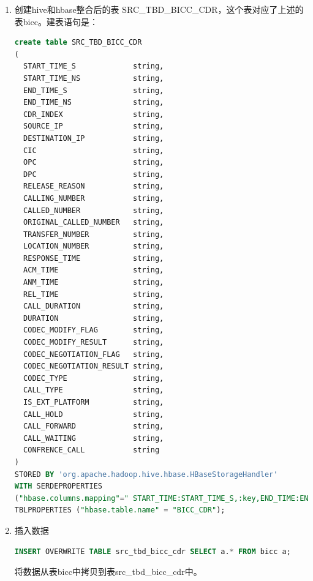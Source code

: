 \begin{enumerate}

\item 创建hive和hbase整合后的表 SRC\_TBD\_BICC\_CDR，这个表对应了上述的表bicc。建表语句是：

\begin{lstlisting}[language=SQL]
create table SRC_TBD_BICC_CDR
(
  START_TIME_S             string,
  START_TIME_NS            string,
  END_TIME_S               string,
  END_TIME_NS              string,
  CDR_INDEX                string,
  SOURCE_IP                string,
  DESTINATION_IP           string,
  CIC                      string,
  OPC                      string,
  DPC                      string,
  RELEASE_REASON           string,
  CALLING_NUMBER           string,
  CALLED_NUMBER            string,
  ORIGINAL_CALLED_NUMBER   string,
  TRANSFER_NUMBER          string,
  LOCATION_NUMBER          string,
  RESPONSE_TIME            string,
  ACM_TIME                 string,
  ANM_TIME                 string,
  REL_TIME                 string,
  CALL_DURATION            string,
  DURATION                 string,
  CODEC_MODIFY_FLAG        string,
  CODEC_MODIFY_RESULT      string,
  CODEC_NEGOTIATION_FLAG   string,
  CODEC_NEGOTIATION_RESULT string,
  CODEC_TYPE               string,
  CALL_TYPE                string,
  IS_EXT_PLATFORM          string,
  CALL_HOLD                string,
  CALL_FORWARD             string,
  CALL_WAITING             string,
  CONFRENCE_CALL           string
)
STORED BY 'org.apache.hadoop.hive.hbase.HBaseStorageHandler'  
WITH SERDEPROPERTIES 
("hbase.columns.mapping"=" START_TIME:START_TIME_S,:key,END_TIME:END_TIME_S,END_TIME:END_TIME_NS,INDEX:CDR_INDEX,IP:SOURCE_IP,IP:DESTINATION_IP,C:CIC,C:OPC,C:DPC,REASON:RELEASE_REASON,NUMBER:CALLING_NUMBER,NUMBER:CALLED_NUMBER,NUMBER:ORIGINAL_CALLED_NUMBER,NUMBER:TRANSFER_NUMBER,NUMBER:LOCATION_NUMBER,TIME:RESPONSE_TIME,TIME:ACM_TIME,TIME:ANM_TIME,TIME:REL_TIME,DURATION:CALL_DURATION,DURATION:DURATION,CODEC:CODEC_MODIFY_FLAG,CODEC:CODEC_MODIFY_RESULT,CODEC:CODEC_NEGOTIATION_FLAG,CODEC:CODEC_NEGOTIATION_RESULT,TYPE:CODEC_TYPE,TYPE:CALL_TYPE,PLATFORM:IS_EXT_PLATFORM,CALL:CALL_HOLD,CALL:CALL_FORWARD,CALL:CALL_WAITING,CALL:CONFRENCE_CALL")
TBLPROPERTIES ("hbase.table.name" = "BICC_CDR");
\end{lstlisting}

\item 插入数据

\begin{lstlisting}[language=SQL]
INSERT OVERWRITE TABLE src_tbd_bicc_cdr SELECT a.* FROM bicc a;
\end{lstlisting}
将数据从表bicc中拷贝到表src\_tbd\_bicc\_cdr中。


\end{enumerate}
